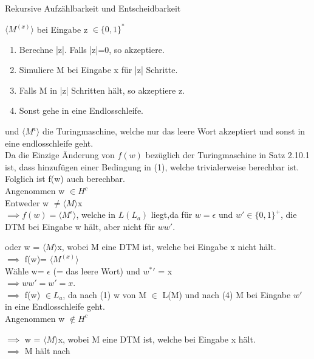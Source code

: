 \documentclass[answers]{submit}
\begin{document}
\begin{exercise}[6]{Rekursive Aufzählbarkeit und Entscheidbarkeit}
{    $\langle M^{(x)}\rangle$ bei Eingabe z $\in \{0,1\}^*$
    \begin{enumerate}
      \item Berechne |z|. Falls |z|=0, so akzeptiere.
      \item Simuliere M bei Eingabe x für |z| Schritte.
      \item Falls M in |z| Schritten hält, so akzeptiere z.
      \item Sonst gehe in eine Endlosschleife.
    \end{enumerate}

    und $\langle M^{\epsilon} \rangle$ die Turingmaschine, welche nur das leere Wort akzeptiert und sonst in eine endlosschleife geht. \\

    Da die Einzige Änderung von $f(w)$ bezüglich der Turingmaschine in Satz 2.10.1 ist,
    dass hinzufügen einer Bedingung in (1), welche trivialerweise berechbar ist. Folglich ist f(w) auch berechbar. \\

    Angenommen w $\in H^c$ \\

    Entweder w $ \neq \langle M\rangle$x \\

    $\implies f(w)= \langle M^{\epsilon} \rangle$, welche in $L(L_a)$ liegt,da für $w = \epsilon$ und $w' \in \{0,1\}^+$, die DTM bei Eingabe w hält, aber nicht für $ww'$.

    oder w = $\langle M\rangle$x, wobei M eine DTM ist, welche bei Eingabe x nicht hält. \\

    $\implies$ f(w)= $\langle M^{(x)} \rangle$ \\

    Wähle w= $\epsilon$ (= das leere Wort) und ${w^*}'$ = x \\

    $\implies ww' = w' = x$. \\

    $\implies$ f(w) $\in L_a$, da nach (1) w von M $\in$ L(M) und nach (4) M bei Eingabe $w'$ in eine Endlosschleife geht. \\

    Angenommen w $\notin H^c$

    $\implies$ w = $\langle M\rangle$x, wobei M eine DTM ist, welche bei Eingabe x hält. \\

    $\implies$ M hält nach



}
\end{exercise}
\end{document}
